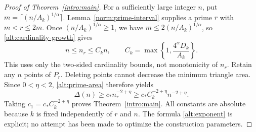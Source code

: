 \begin{proof}[Proof of Theorem~\ref{intro:main}]
For a sufficiently large integer $n$, put
$m=\lceil(n/A_k)^{1/\alpha}\rceil$.
Lemma~\ref{norm:prime-interval} supplies a prime $r$ with $m<r\le2m$.
Once $(n/A_k)^{1/\alpha}\ge1$, we have
$m\le2(n/A_k)^{1/\alpha}$, so \eqref{alt:cardinality-growth} gives
\[
 n\le n_r\le C_kn,
 \qquad C_k=\max\left\{1,\frac{4^\alpha D_k}{A_k}\right\}.
\]
This uses only the two-sided cardinality bounds, not monotonicity of $n_r$.
Retain any $n$ points of $P_r$. Deleting points cannot decrease the minimum
triangle area. Since $0<\eta<2$, \eqref{alt:prime-area} therefore yields
\[
 \Delta(n)\ge c_* n_r^{-2+\eta}
 \ge c_*C_k^{-2+\eta}n^{-2+\eta}.
\]
Taking $c_1=c_*C_k^{-2+\eta}$ proves Theorem~\ref{intro:main}.
All constants are absolute because $k$ is fixed independently of $r$ and
$n$. The formula \eqref{alt:exponent} is explicit; no attempt has been
made to optimize the construction parameters.
\end{proof}
